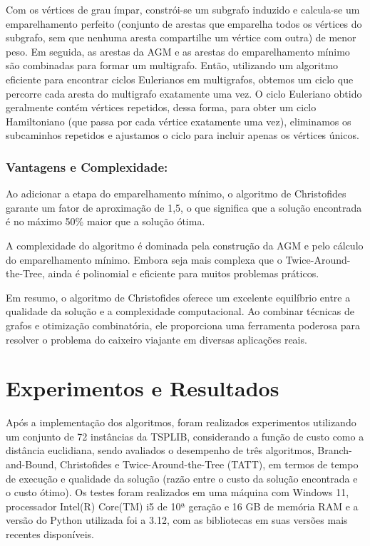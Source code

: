 \documentclass[12pt]{article}
\begin{document}
Com os vértices de grau ímpar, constrói-se um subgrafo induzido e calcula-se um emparelhamento perfeito (conjunto de arestas que emparelha todos os vértices do subgrafo, sem que nenhuma aresta compartilhe um vértice com outra) de menor peso. Em seguida, as arestas da AGM e as arestas do emparelhamento mínimo são combinadas para formar um multigrafo. Então, utilizando um algoritmo eficiente para encontrar ciclos Eulerianos em multigrafos, obtemos um ciclo que percorre cada aresta do multigrafo exatamente uma vez. O ciclo Euleriano obtido geralmente contém vértices repetidos, dessa forma, para obter um ciclo Hamiltoniano (que passa por cada vértice exatamente uma vez), eliminamos os subcaminhos repetidos e ajustamos o ciclo para incluir apenas os vértices únicos.

\subsubsection{Vantagens e Complexidade:}

Ao adicionar a etapa do emparelhamento mínimo, o algoritmo de Christofides garante um fator de aproximação de 1,5, o que significa que a solução encontrada é no máximo 50\% maior que a solução ótima.

A complexidade do algoritmo é dominada pela construção da AGM e pelo cálculo do emparelhamento mínimo. Embora seja mais complexa que o Twice-Around-the-Tree, ainda é polinomial e eficiente para muitos problemas práticos.

Em resumo, o algoritmo de Christofides oferece um excelente equilíbrio entre a qualidade da solução e a complexidade computacional. Ao combinar técnicas de grafos e otimização combinatória, ele proporciona uma ferramenta poderosa para resolver o problema do caixeiro viajante em diversas aplicações reais.

\section{Experimentos e Resultados}

Após a implementação dos algoritmos, foram realizados experimentos utilizando um conjunto de 72 instâncias da TSPLIB, considerando a função de custo como a distância euclidiana, sendo avaliados o desempenho de três algoritmos, Branch-and-Bound, Christofides e Twice-Around-the-Tree (TATT), em termos de tempo de execução e qualidade da solução (razão entre o custo da solução encontrada e o custo ótimo). Os testes foram realizados em uma máquina com Windows 11, processador Intel(R) Core(TM) i5 de 10ª geração e 16 GB de memória RAM e a versão do Python utilizada foi a 3.12, com as bibliotecas em suas versões mais recentes disponíveis.  
\end{document}
